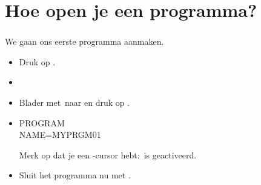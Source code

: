 \section{Hoe open je een programma?}

\begin{frame}
\frametitle{ \tiPRGM}


We gaan ons eerste programma aanmaken.
\begin{itemize}
  \item Druk op \tiPRGM.
  \pause %
  \item {}
  \pause %
  \item Blader met \tiRight\,naar  en druk op \tiENTER.
  \pause %
  \item {}
	  \begin{ticalc}[3.25cm]
	  	PROGRAM\\
	  	NAME=MYPRGM01
	  \end{ticalc}
  
  Merk op dat je een \tiCursorAlpha-cursor hebt: \tiALOCK\,is geactiveerd.
  \pause %
  \item Sluit het programma nu met \tiQUIT.
\end{itemize}
\end{frame}

